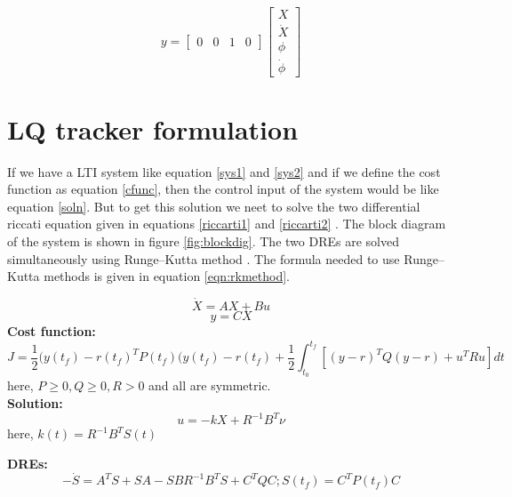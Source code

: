 \documentclass[12pt]{article}
\begin{document}
\begin{equation}
y=
\begin{bmatrix}
0&0&1&0
\end{bmatrix}
\begin{bmatrix}
X\\\dot{X}\\\phi\\\dot{\phi}
\end{bmatrix}
\end{equation}

\section{LQ tracker formulation}\label{LQ tracker formulation}
If we have a LTI system like equation \ref{sys1} and \ref{sys2} and if we define the cost function as equation \ref{cfunc}, then the control input of the system would be like equation \ref{soln}. But to get this solution we neet to solve the two differential riccati equation given in equations \ref{riccarti1} and \ref{riccarti2} \cite{lecNote}. The block diagram of the system is shown in figure \ref{fig:blockdig}. The two DREs are solved simultaneously using Runge–Kutta method \cite{rkMethod}. The formula needed to use Runge–Kutta methods is given in equation \ref{eqn:rkmethod}.

\begin{equation}
\dot{X}=AX+Bu
\label{sys1}
\end{equation}
\begin{equation}
y=CX
\label{sys2}
\end{equation}
\textbf{Cost function:}
\begin{equation}
\label{cfunc}
J=\frac{1}{2}(y(t_f)-r(t_f)^TP(t_f)(y(t_f)-r(t_f)+\frac{1}{2}\int_{t_0}^{t_f}[(y-r)^TQ(y-r)+u^TRu]dt
\end{equation}
here, $P\geq0,Q\geq0,R>0$ and all are symmetric.\\


\textbf{Solution:}
\begin{equation}
u=-kX+R^{-1}B^T\nu
\label{soln}
\end{equation}
here, $k(t)=R^{-1}B^TS(t)$

\textbf{DREs:}
\begin{equation}
-\dot{S}=A^TS+SA-SBR^{-1}B^TS+C^TQC;S(t_f)=C^TP(t_f)C
\label{riccarti1}
\end{equation}
\end{document}
